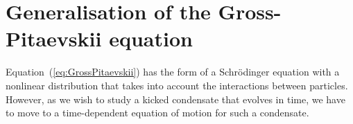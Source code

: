 \section{Generalisation of the Gross-Pitaevskii equation}
Equation~(\ref{eq:GrossPitaevskii}) has the form of a Schr\"odinger equation with a nonlinear distribution that takes into account the 
interactions between particles. However, as we wish to study a kicked condensate that evolves in time, we have to move to a time-dependent 
equation of motion for such a condensate. 



